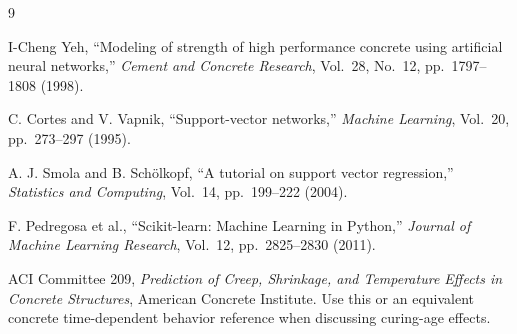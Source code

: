 \documentclass[12pt]{article}
\begin{document}
\begin{thebibliography}{9}

I-Cheng Yeh, ``Modeling of strength of high performance concrete using artificial neural networks,'' \emph{Cement and Concrete Research}, Vol.~28, No.~12, pp.~1797--1808 (1998).

C. Cortes and V. Vapnik, ``Support-vector networks,'' \emph{Machine Learning}, Vol.~20, pp.~273--297 (1995).

A. J. Smola and B. Sch\"olkopf, ``A tutorial on support vector regression,'' \emph{Statistics and Computing}, Vol.~14, pp.~199--222 (2004).

F. Pedregosa et al., ``Scikit-learn: Machine Learning in Python,'' \emph{Journal of Machine Learning Research}, Vol.~12, pp.~2825--2830 (2011).

ACI Committee 209, \emph{Prediction of Creep, Shrinkage, and Temperature Effects in Concrete Structures}, American Concrete Institute.  Use this or an equivalent concrete time-dependent behavior reference when discussing curing-age effects.

\end{thebibliography}
\end{document}
